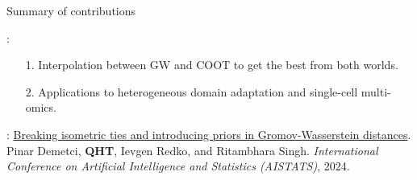 \documentclass{beamer}
\begin{document}
\begin{frame}{Summary of contributions}
  \scriptsize


  \vspace{5cm}
  {}:
  \begin{enumerate}
    \setlength\itemindent{10pt}
    \item[1.] Interpolation between GW and COOT to get the best from both worlds.
    \item[2.] Applications to heterogeneous domain adaptation and single-cell multi-omics.
  \end{enumerate}

  \vspace{0.3cm}
  {}: \ul{Breaking isometric ties and introducing priors in Gromov-Wasserstein distances}.
  Pinar Demetci, \textbf{QHT}, Ievgen Redko, and Ritambhara Singh.
  \textit{International Conference on Artificial Intelligence and Statistics (AISTATS)}, 2024.

\end{frame}
\end{document}
